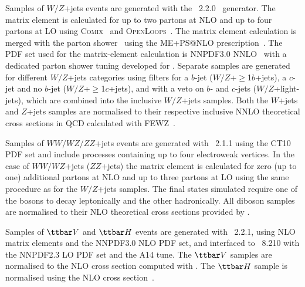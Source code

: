 Samples of $W/Z$+jets events are generated with the {\sherpa}~2.2.0~\cite{Gleisberg:2008ta} generator. 
The matrix element is calculated for up to two partons at NLO and up to four partons at LO using 
\textsc{Comix}~\cite{Gleisberg:2008fv} and \textsc{OpenLoops}~\cite{Cascioli:2011va}. The matrix element calculation 
is merged with the {\sherpa} parton shower~\cite{Schumann:2007mg} using the ME+PS@NLO prescription~\cite{Hoeche:2012yf}. 
The PDF set used for the matrix-element calculation is NNPDF3.0 NNLO~\cite{Ball:2014uwa} with a dedicated parton shower tuning developed for {\sherpa}. 
Separate samples are generated for different $W/Z$+jets categories using filters for a $b$-jet 
($W/Z$+$\geq$1$b$+jets), a $c$-jet and no $b$-jet ($W/Z$+$\geq$1$c$+jets), and with a veto on $b$- and $c$-jets 
($W/Z$+light-jets), which are combined into the inclusive $W/Z$+jets samples.
Both the $W$+jets and $Z$+jets samples are normalised to their respective inclusive NNLO theoretical 
cross sections in QCD calculated with \textsc{FEWZ}~\cite{Anastasiou:2003ds}.

Samples of $WW/WZ/ZZ$+jets events are generated with {\sherpa}~2.1.1 using the CT10 PDF set
and include processes containing up to four electroweak vertices. 
In the case of $WW/WZ$+jets ($ZZ$+jets) the matrix element is calculated for zero (up to one) additional partons 
at NLO and up to three partons at LO using the same procedure as for the $W/Z$+jets samples. 
The final states simulated require one of the bosons to decay leptonically and the other hadronically.
All diboson samples are normalised to their NLO theoretical cross sections provided by {\sherpa}. 

Samples of $\ttbar V$ and $\ttbar H$ events are generated with {\amcatnlo}~2.2.1, using NLO matrix elements and the NNPDF3.0 NLO PDF set,
and interfaced to {\pythia}~8.210 with the NNPDF2.3 LO PDF set and the A14 tune.
The $\ttbar V$ samples are normalised to the NLO cross section computed with {\amcatnlo}.
The $\ttbar H$ sample is normalised using the NLO cross section~\cite{deFlorian:2016spz}.


